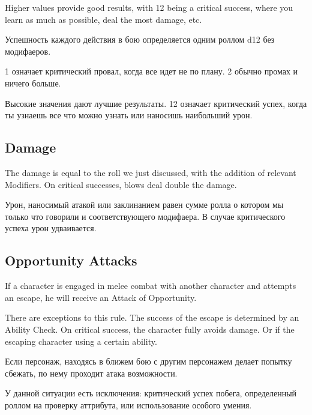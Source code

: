 \documentclass[a5paper,11pt]{book}
\begin{document}
\begin{multicols}{2}
\begin{en}
Higher values provide good results, with 12 being a critical success, where you learn as much as possible, deal the most damage, etc.
\end{en}

\begin{ru}
Успешность каждого действия в бою определяется одним роллом d12 без модифаеров.

1 означает критический провал, когда все идет не по плану. 2 обычно промах и ничего больше.

Высокие значения дают лучшие результаты. 12 означает критический успех, когда ты узнаешь все что можно узнать или наносишь наибольший урон.
\end{ru}

\subsection{Damage}
\begin{en}
The damage is equal to the roll we just discussed, with the addition of relevant Modifiers. On critical successes, blows deal double the damage.
\end{en}

\begin{ru}
Урон, наносимый атакой или заклинанием равен сумме ролла о котором мы только что говорили и соответствующего модифаера. В случае критического успеха урон удваивается.
\end{ru}

\subsection{Opportunity Attacks}
\begin{en}
If a character is engaged in melee combat with another character and attempts an escape, he will receive an Attack of Opportunity.

There are exceptions to this rule. The success of the escape is determined by an Ability Check. On critical success, the character fully avoids damage. Or if the escaping character using a certain ability.
\end{en}

\begin{ru}
Если персонаж, находясь в ближем бою с другим персонажем делает попытку сбежать, по нему проходит атака возможности.

У данной ситуации есть исключения: критический успех побега, определенный роллом на проверку аттрибута, или использование особого умения.
\end{ru}


\end{multicols}
\end{document}
